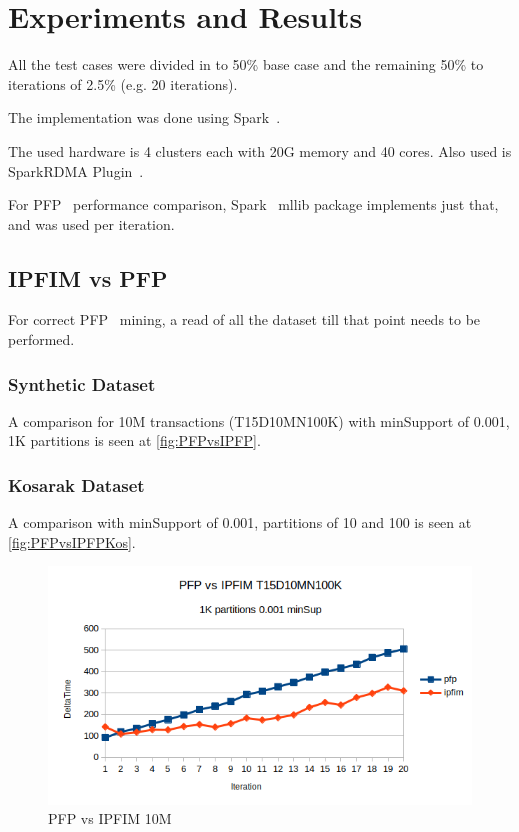 \section{Experiments and Results}


All the test cases were divided in to 50\% base case and the remaining 50\% to iterations of 2.5\% (e.g. 20 iterations).

The implementation was done using Spark~\cite{spark}.

The used hardware is 4 clusters each with 20G memory and 40 cores. Also used is SparkRDMA Plugin~\cite{SparkRDMA}.

For PFP~\cite{li2008pfp} performance comparison, Spark~\cite{spark} mllib package implements just that, and was used per iteration.


\subsection{IPFIM vs PFP}
 For correct PFP~\cite{li2008pfp} mining, a read of all the dataset till that point needs to be performed.
\subsubsection{Synthetic Dataset}
A comparison for 10M transactions (T15D10MN100K) with minSupport of 0.001, 1K partitions is seen at \autoref{fig:PFPvsIPFP}.

\subsubsection{Kosarak Dataset}
A comparison with minSupport of 0.001, partitions of 10 and 100 is seen at \autoref{fig:PFPvsIPFPKos}.


\begin{figure}
  \centering
  \includegraphics[width=\linewidth]{figures/PFPvsIPFIM0_001_10M}
  \caption{PFP vs IPFIM 10M}
  \label{fig:PFPvsIPFP}
\end{figure}

